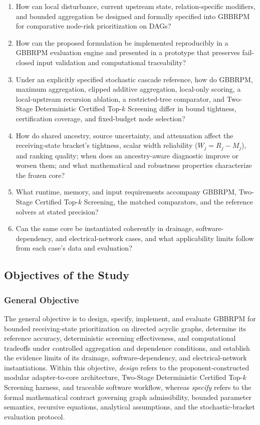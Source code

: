 \begin{enumerate}[label=\arabic*.,leftmargin=*]
\item How can local disturbance, current upstream state, relation-specific
modifiers, and bounded aggregation be designed and formally specified into
GBBRPM for comparative node-risk prioritization on DAGs?
\item How can the proposed formulation be implemented reproducibly in a
GBBRPM evaluation engine and presented in a prototype that preserves
fail-closed input validation and computational traceability?
\item Under an explicitly specified stochastic cascade reference, how do
GBBRPM, maximum aggregation, clipped additive aggregation, local-only
scoring, a local-upstream recursion ablation, a restricted-tree
comparator, and Two-Stage Deterministic Certified Top-$k$ Screening differ in
bound tightness, certification coverage, and fixed-budget node selection?
\item How do shared ancestry, source uncertainty, and attenuation affect
the receiving-state bracket's tightness, scalar width reliability
($W_j = R_j - M_j$), and ranking quality; when does an ancestry-aware
diagnostic improve or worsen them; and what mathematical and robustness
properties characterize the frozen core?
\item What runtime, memory, and input requirements accompany GBBRPM,
Two-Stage Certified Top-$k$ Screening, the matched comparators, and the
reference solvers at stated precision?
\item Can the same core be instantiated coherently in drainage,
software-dependency, and electrical-network cases, and what applicability
limits follow from each case's data and evaluation?
\end{enumerate}

\subsection{Objectives of the Study}\label{objectives-of-the-study}

\subsubsection{General Objective}\label{general-objective}

The general objective is to design, specify, implement, and evaluate GBBRPM
for bounded receiving-state prioritization on directed acyclic graphs,
determine its reference accuracy, deterministic screening effectiveness, and
computational tradeoffs under controlled aggregation and dependence
conditions, and establish the evidence limits of its drainage,
software-dependency, and electrical-network instantiations. Within this
objective, \emph{design} refers to the proponent-constructed modular
adapter-to-core architecture, Two-Stage Deterministic Certified Top-$k$
Screening harness, and traceable software workflow, whereas \emph{specify}
refers to the formal mathematical contract governing graph admissibility,
bounded parameter semantics, recursive equations, analytical assumptions, and
the stochastic-bracket evaluation protocol.

